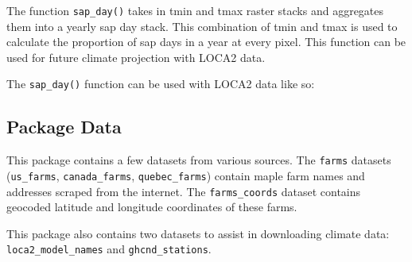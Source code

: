 \documentclass[
]{article}
\newenvironment{Shaded}{}{}
\newcommand{\AttributeTok}[1]{\textcolor[rgb]{0.49,0.56,0.16}{#1}}
\newcommand{\CommentTok}[1]{\textcolor[rgb]{0.38,0.63,0.69}{\textit{#1}}}
\newcommand{\DecValTok}[1]{\textcolor[rgb]{0.25,0.63,0.44}{#1}}
\newcommand{\FloatTok}[1]{\textcolor[rgb]{0.25,0.63,0.44}{#1}}
\newcommand{\FunctionTok}[1]{\textcolor[rgb]{0.02,0.16,0.49}{#1}}
\newcommand{\NormalTok}[1]{#1}
\newcommand{\OtherTok}[1]{\textcolor[rgb]{0.00,0.44,0.13}{#1}}
\newcommand{\SpecialCharTok}[1]{\textcolor[rgb]{0.25,0.44,0.63}{#1}}
\newcommand{\StringTok}[1]{\textcolor[rgb]{0.25,0.44,0.63}{#1}}
\begin{document}
The function \texttt{sap\_day()} takes in tmin and tmax raster stacks
and aggregates them into a yearly sap day stack. This combination of
tmin and tmax is used to calculate the proportion of sap days in a year
at every pixel. This function can be used for future climate projection
with LOCA2 data.

The \texttt{sap\_day()} function can be used with LOCA2 data like so:

\begin{Shaded}
\end{Shaded}

\subsection{Package Data}\label{package-data}

This package contains a few datasets from various sources. The
\texttt{farms} datasets (\texttt{us\_farms}, \texttt{canada\_farms},
\texttt{quebec\_farms}) contain maple farm names and addresses scraped
from the internet. The \texttt{farms\_coords} dataset contains geocoded
latitude and longitude coordinates of these farms.

This package also contains two datasets to assist in downloading climate
data: \texttt{loca2\_model\_names} and \texttt{ghcnd\_stations}.
\end{document}
